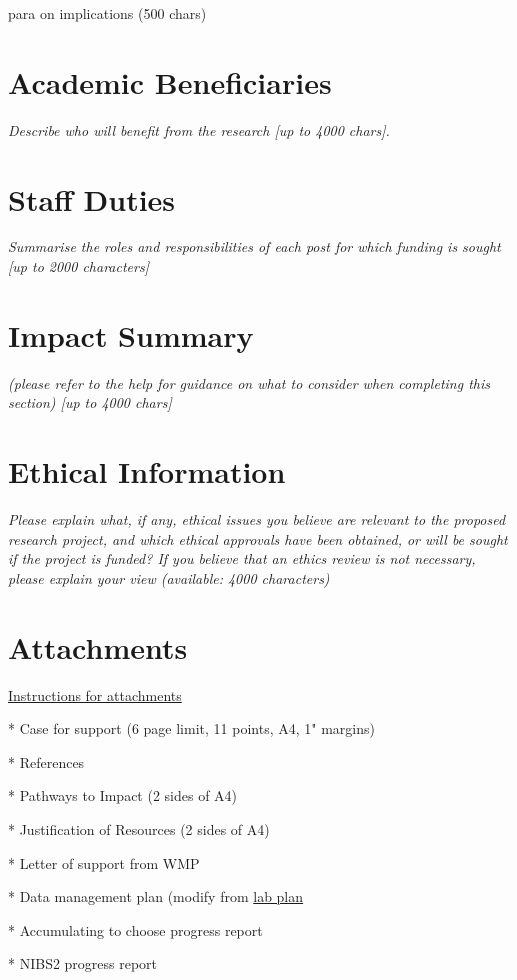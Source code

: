 \documentclass[11pt, a4paper]{article}
\begin{document}
 
para on implications (500 chars)



\section{Academic Beneficiaries}

\textit{Describe who will benefit from the research [up to 4000 chars].}

\section{Staff Duties}

\textit{Summarise the roles and responsibilities of each post for which funding is sought [up to 2000 characters]}

\section{Impact Summary }

\textit{(please refer to the help for guidance on what to consider when completing this section) [up to 4000 chars]}

\section{Ethical Information}

\textit{Please explain what, if any, ethical issues you believe are relevant to the proposed research project, and which ethical approvals have been obtained, or will be sought if the project is funded? If you believe that an ethics review is not necessary, please explain your view (available: 4000 characters)}


\section{Attachments}

\href{https://je-s.rcuk.ac.uk/Handbook/Index.htm#pages/GuidanceonCompletingaStandardG/CaseforSupportandAttachments/ESRCSpecificRequirements.htm}{Instructions for attachments}

* Case for support (6 page limit, 11 points, A4, 1" margins) 

* References

* Pathways to Impact (2 sides of A4) 

* Justification of Resources (2 sides of A4)

* Letter of support from WMP

* Data management plan (modify from \href{https://github.com/neil-stewart/data_management_plan}{lab plan}


* Accumulating to choose progress report

* NIBS2 progress report



\newpage



\end{document}
